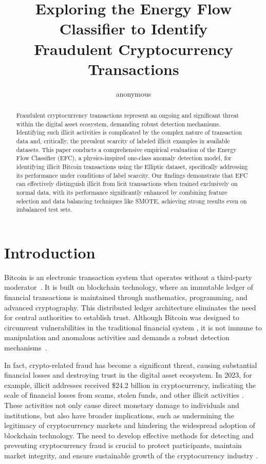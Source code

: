 \documentclass[12pt]{article}
\title{Exploring the Energy Flow Classifier to Identify \\ Fraudulent Cryptocurrency Transactions}
\author{anonymous}
\begin{document}
 

\maketitle

\begin{abstract}
  Fraudulent cryptocurrency transactions represent an ongoing and significant threat within the digital asset ecosystem,
  demanding robust detection mechanisms. Identifying such illicit activities is complicated by the complex nature of transaction
  data and, critically, the prevalent scarcity of labeled illicit examples in available datasets. This paper conducts a
  comprehensive empirical evaluation of the Energy Flow Classifier (EFC), a physics-inspired one-class anomaly detection
  model, for identifying illicit Bitcoin transactions using the Elliptic dataset, specifically addressing its performance
  under conditions of label scarcity. Our findings demonstrate that EFC can effectively distinguish illicit from licit
  transactions when trained exclusively on normal data, with its performance significantly enhanced by combining feature
  selection and data balancing techniques like SMOTE, achieving strong results even on imbalanced test sets.
\end{abstract}

\section{Introduction} \label{sec:introduction}
Bitcoin is an electronic transaction system that operates without a third-party moderator~\cite{nakamoto2008bitcoin}. It is
built on blockchain technology, where an immutable ledger of financial transactions is maintained through mathematics,
programming, and advanced cryptography. This distributed ledger architecture eliminates the need for central authorities
to establish trust. Although Bitcoin was designed to circumvent vulnerabilities in the traditional financial system
\cite{nakamoto2008bitcoin}, it is not immune to manipulation and anomalous activities and demands a robust detection
mechanisms~\cite{fang2022cryptocurrency, zhang2020financial,zainal2018review}. 

In fact, crypto-related fraud has become a significant threat, causing substantial financial losses and destroying
trust in the digital asset ecosystem. In 2023, for example, illicit addresses received \$24.2 billion in cryptocurrency,
indicating the scale of financial losses from scams, stolen funds, and other illicit activities \cite{chainalysis2024cryptocrime}.
These activities not only cause direct monetary damage to individuals and institutions, but also have broader implications,
such as undermining the legitimacy of cryptocurrency markets and hindering the widespread adoption of blockchain technology.
The need to develop effective methods for detecting and preventing cryptocurrency fraud is crucial to protect participants,
maintain market integrity, and ensure sustainable growth of the cryptocurrency industry \cite{scharfman2024, Khiari2025}.
\end{document}
